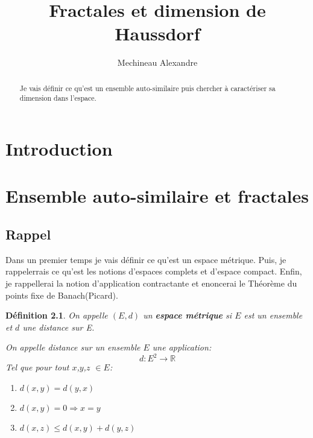 \documentclass[a4paper, 12pt]{report}
\title{ \bf Fractales et dimension de Haussdorf}
\author{Mechineau Alexandre}
\begin{document}
	\newtheorem{definition}{Définition}
	\newtheorem{prop}{Proposition}
	\newtheorem{theorem}{Théorème}
	\newtheorem*{remark*}{Remarque}
	
	
	\maketitle
	
	\begin{abstract}
		Je vais définir ce qu'est un ensemble auto-similaire puis chercher à caractériser sa dimension dans l'espace. 
	\end{abstract}
	
	\tableofcontents
	
	\chapter{\bf Introduction}
	
	\chapter{\bf Ensemble auto-similaire et fractales}
		\section{Rappel}
			Dans un premier temps je vais définir ce qu'est un espace métrique. Puis, je rappelerrais ce qu'est les notions d'espaces complets et d'espace compact. Enfin, je rappellerai la notion d'application contractante et enoncerai le Théorème du points fixe de Banach(Picard).
			
			\begin{definition}
				On appelle $(E,d)$ un \textbf{espace métrique} si $E$ est un ensemble et $d$ une distance sur E.
				
				On appelle distance sur un ensemble $E$ une application:
				\begin{equation*}
					d:E^2\longrightarrow \mathds{R}
				\end{equation*}
			Tel que pour tout $x$,$y$,$z$ $\in E$:
				\begin{enumerate}\itemsep2pt
					\item $d(x,y)=d(y,x)$
					\item $d(x,y)=0 \Longrightarrow x=y$
					\item $d(x,z) \leq d(x,y)+d(y,z)$
				\end{enumerate}
			\end{definition}
			
\end{document}
